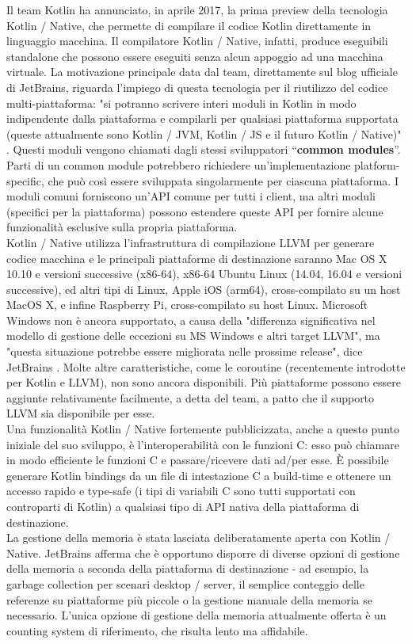 Il team Kotlin ha annunciato, in aprile 2017, la prima preview della tecnologia Kotlin / Native, che permette di compilare il codice Kotlin direttamente in linguaggio macchina. Il compilatore Kotlin / Native, infatti, produce eseguibili standalone che possono essere eseguiti senza alcun appoggio ad una macchina virtuale. La motivazione principale data dal team, direttamente sul blog ufficiale di JetBrains, riguarda l'impiego di questa tecnologia per il riutilizzo del codice multi-piattaforma: "si potranno scrivere interi moduli in Kotlin in modo indipendente dalla piattaforma e compilarli per qualsiasi piattaforma supportata (queste attualmente sono Kotlin / JVM, Kotlin / JS e il futuro Kotlin / Native)" \cite{kotlinNativePreview}. Questi moduli vengono chiamati dagli stessi sviluppatori “{\bfseries common modules}”. Parti di un common module potrebbero richiedere un'implementazione platform-specific, che può così essere sviluppata singolarmente per ciascuna piattaforma. I moduli comuni forniscono un'API comune per tutti i client, ma altri moduli (specifici per la piattaforma) possono estendere queste API per fornire alcune funzionalità esclusive sulla propria piattaforma.\\
Kotlin / Native utilizza l'infrastruttura di compilazione LLVM per generare codice macchina e le principali piattaforme di destinazione saranno Mac OS X 10.10 e versioni successive (x86-64), x86-64 Ubuntu Linux (14.04, 16.04 e versioni successive), ed altri tipi di Linux, Apple iOS (arm64), cross-compilato su un host MacOS X, e infine Raspberry Pi, cross-compilato su host Linux. Microsoft Windows non è ancora supportato, a causa della "differenza significativa nel modello di gestione delle eccezioni su MS Windows e altri target LLVM", ma "questa situazione potrebbe essere migliorata nelle prossime release", dice JetBrains \cite{kotlinNativePreview}. Molte altre caratteristiche, come le coroutine (recentemente introdotte per Kotlin e LLVM), non sono ancora disponibili. Più piattaforme possono essere aggiunte relativamente facilmente, a detta del team, a patto che il supporto LLVM sia disponibile per esse.\\

Una funzionalità Kotlin / Native fortemente pubblicizzata, anche a questo punto iniziale del suo sviluppo, è l'interoperabilità con le funzioni C: esso può chiamare in modo efficiente le funzioni C e passare/ricevere dati ad/per esse. È possibile generare Kotlin bindings da un file di intestazione C a build-time e ottenere un accesso rapido e type-safe (i tipi di variabili C sono tutti supportati con controparti di Kotlin) a qualsiasi tipo di API nativa della piattaforma di destinazione.\\
La gestione della memoria è stata lasciata deliberatamente aperta con Kotlin / Native. JetBrains afferma che è opportuno disporre di diverse opzioni di gestione della memoria a seconda della piattaforma di destinazione - ad esempio, la garbage collection per scenari desktop / server, il semplice conteggio delle referenze su piattaforme più piccole o la gestione manuale della memoria se necessario. L'unica opzione di gestione della memoria attualmente offerta è un counting system di riferimento, che risulta lento ma affidabile.\\

